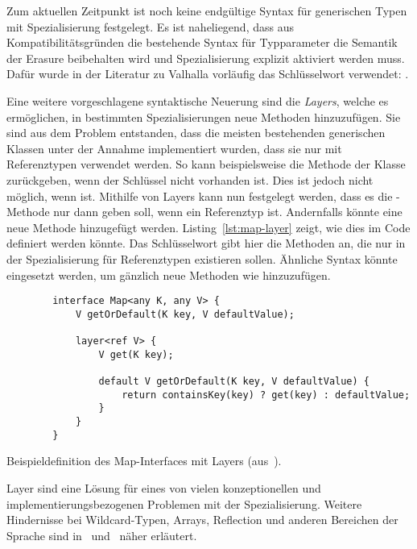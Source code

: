 Zum aktuellen Zeitpunkt ist noch keine endgültige Syntax für generischen Typen mit Spezialisierung festgelegt.
Es ist naheliegend, dass aus Kompatibilitätsgründen die bestehende Syntax für Typparameter die Semantik der Erasure beibehalten wird und Spezialisierung explizit aktiviert werden muss.
Dafür wurde in der Literatur zu Valhalla vorläufig das Schlüsselwort  verwendet: .

Eine weitere vorgeschlagene syntaktische Neuerung sind die \emph{Layers}, welche es ermöglichen, in bestimmten Spezialisierungen neue Methoden hinzuzufügen.
Sie sind aus dem Problem entstanden, dass die meisten bestehenden generischen Klassen unter der Annahme implementiert wurden, dass sie nur mit Referenztypen verwendet werden.
So kann beispielsweise die Methode  der Klasse   zurückgeben, wenn der Schlüssel nicht vorhanden ist.
Dies ist jedoch nicht möglich, wenn  ist.
Mithilfe von Layers kann nun festgelegt werden, dass es die -Methode nur dann geben soll, wenn  ein Referenztyp ist.
Andernfalls könnte eine neue Methode  hinzugefügt werden.
Listing~\ref{lst:map-layer} zeigt, wie dies im Code definiert werden könnte.
Das Schlüsselwort  gibt hier die Methoden an, die nur in der Spezialisierung für Referenztypen  existieren sollen.
Ähnliche Syntax könnte eingesetzt werden, um gänzlich neue Methoden wie  hinzuzufügen.

\begin{listing}
    \begin{verbatim}
        interface Map<any K, any V> {
            V getOrDefault(K key, V defaultValue);

            layer<ref V> {
                V get(K key);

                default V getOrDefault(K key, V defaultValue) {
                    return containsKey(key) ? get(key) : defaultValue;
                }
            }
        }
    \end{verbatim}
    \vspace{-3ex}
    \caption{Beispieldefinition des Map-Interfaces mit Layers (aus~\cite{specialization}).}
    \label{lst:map-layer}
\end{listing}

Layer sind eine Lösung für eines von vielen konzeptionellen und implementierungsbezogenen Problemen mit der Spezialisierung.
Weitere Hindernisse bei Wildcard-Typen, Arrays, Reflection und anderen Bereichen der Sprache sind in~\cite{jep-218} und~\cite{specialization} näher erläutert.

